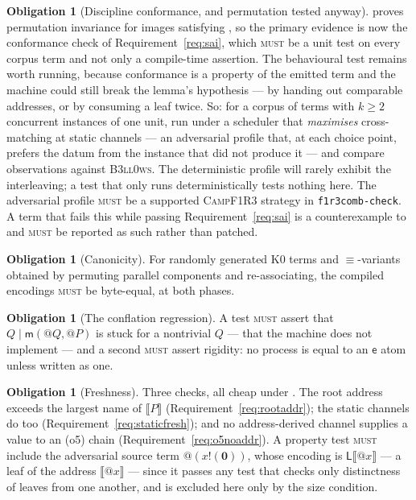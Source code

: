 \documentclass[11pt,a4paper]{article}
\makeatletter
\newcommand{\code}[1]{\texttt{#1}}
\newcommand{\Camp}{\textsc{CampF1R3}}
\newcommand{\Bell}{\textsc{B3ll0ws}}
\newcommand{\MUST}{\textsc{must}}
\newcommand{\quo}[1]{@#1}
\newcommand{\out}[2]{#1!(#2)}
\newcommand{\nil}{\mathbf{0}}
\newcommand{\enc}[1]{\llbracket #1 \rrbracket}
\newcommand{\mm}{\mathsf{m}}
\newcommand{\ev}{\mathsf{e}}
\newcommand{\Lft}{\mathsf{L}}
\newcommand{\scong}{\equiv}
\theoremstyle{definition}
\newtheorem{obligation}[definition]{Obligation}
\theoremstyle{plain}
\makeatother
\begin{document}
\begin{obligation}[Discipline conformance, and permutation tested anyway]
\label{obl:permutetest}
\cite[Lem.~6.11]{draft3} proves permutation invariance for images satisfying
\cite[Def.~6.10]{draft3}, so the primary evidence is now the conformance check
of Requirement~\ref{req:sai}, which \MUST{} be a unit test on every corpus
term and not only a compile-time assertion. The behavioural test remains
worth running, because conformance is a property of the emitted term and the
machine could still break the lemma's hypothesis --- by handing out comparable
addresses, or by consuming a leaf twice. So: for a corpus of terms with $k \geq 2$ concurrent
instances of one unit, run under a scheduler that \emph{maximises}
cross-matching at static channels --- an adversarial profile that, at each
choice point, prefers the datum from the instance that did not produce it ---
and compare observations against \Bell. The deterministic profile will rarely
exhibit the interleaving; a test that only runs deterministically tests
nothing here. The adversarial profile \MUST{} be a supported \Camp{} strategy
in \code{f1r3comb-check}. A term that fails this while passing
Requirement~\ref{req:sai} is a counterexample to
\cite[Lem.~6.11]{draft3} and \MUST{} be reported as such rather than patched.
\end{obligation}

\begin{obligation}[Canonicity]\label{obl:canon}
For randomly generated K0 terms and $\scong$-variants obtained by permuting
parallel components and re-associating, the compiled encodings \MUST{} be
byte-equal, at both phases.
\end{obligation}

\begin{obligation}[The conflation regression]\label{obl:defect}
A test \MUST{} assert that $Q \mid \mm(\quo{Q},\quo{P})$ is stuck for a
nontrivial $Q$ --- that the machine does not implement
\cite[Prop.~3.5]{draft3} --- and a second \MUST{} assert rigidity: no process
is equal to an $\ev$ atom unless written as one.
\end{obligation}

\begin{obligation}[Freshness]\label{obl:fresh}
Three checks, all cheap under \cite[Lem.~6.14]{draft3}. The root address
exceeds the largest name of $\enc{P}$ (Requirement~\ref{req:rootaddr}); the
static channels do too (Requirement~\ref{req:staticfresh}); and no
address-derived channel supplies a value to an (o5) chain
(Requirement~\ref{req:o5noaddr}). A property test \MUST{} include the
adversarial source term $\quo{(\out{x}{\nil})}$, whose encoding is
$\Lft\enc{\quo{x}}$ --- a leaf of the address $\enc{\quo{x}}$ --- since it
passes any test that checks only distinctness of leaves from one another, and
is excluded here only by the size condition.
\end{obligation}
\end{document}
